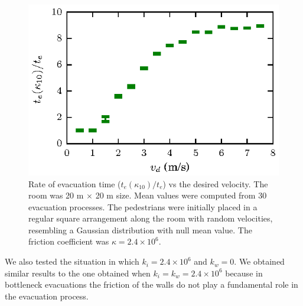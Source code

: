 \begin{figure}[htbp!]
\includegraphics[width=\columnwidth]
{./plots/fis_cociente.eps}
\caption{\label{rate_fis} Rate of evacuation time ($t_e(\kappa_{10})/t_e$) vs the desired velocity. The room was 20 m $\times$ 20 m size. Mean values were computed from 30 evacuation processes. The pedestrians were initially placed in a regular square arrangement along the room with random velocities, resembling a Gaussian distribution with null mean value. The friction coefficient was $\kappa=2.4\times10^{6}$. }
\end{figure}

We also tested the situation in which $k_i=2.4\times 10^{6}$ and $k_w=0$. We obtained similar results to the one obtained when $k_i=k_w=2.4\times 10^{6}$ because in bottleneck evacuations the friction of the walls do not play a fundamental role in the evacuation process. 
